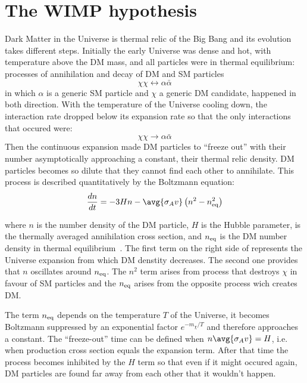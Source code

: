 \pagebreak
\section{The WIMP hypothesis}
\label{sec:wimp}
Dark Matter in the Universe is thermal relic of the Big Bang and its evolution takes different steps. Initially the early Universe was dense and hot, with temperature above the DM mass, and all particles were in thermal equilibrium: processes of annihilation and decay of DM and SM particles 
\begin{equation}
\chi\chi\longleftrightarrow \alpha\bar{\alpha}
\end{equation}
in which $\alpha$ is a generic SM particle and $\chi$ a generic DM candidate, happened in both direction. With the temperature of the Universe cooling down, the interaction rate dropped below its expansion rate so that the only interactions that occured were:
\begin{equation}
\chi\chi\rightarrow \alpha\bar{\alpha}
\label{chitosm}
\end{equation}
Then the continuous expansion made DM particles to ``freeze out'' with their number asymptotically approaching a constant, their thermal relic density. DM particles becomes so dilute that they cannot find each other to annihilate. This process is described quantitatively by the Boltzmann equation:
\begin{equation}
\frac{dn}{dt}=-3Hn-\avg{\sigma_A v}\left(n^2-n_{\textup{eq}}^2\right)
\label{eqn:boltz}
\end{equation}

where $n$ is the number density of the DM particle, $H$ is the Hubble parameter,  is the thermally averaged annihilation cross section, and $n_{\textup{eq}}$ is the DM number density in thermal equilibrium~\cite{feng:DM}. The first term on the right side of \Eqn{\ref{eqn:boltz}} represents the Universe expansion from which DM denstity decreases. The second one provides that $n$ oscillates around $n_\textup{eq}$. The $n^2$ term arises from \Eqn{\ref{chitosm}} process that destroys $\chi$ in favour of SM particles and the $n_\textup{eq}$ arises from the opposite process wich creates DM.

The term $n_\textup{eq}$ depends on the temperature $T$ of the Universe, it becomes Boltzmann suppressed by an exponential factor $e^{-m_\chi/T}$ and therefore approaches a constant. The ``freeze-out'' time can be defined when $n\avg{\sigma_A v} = H$, i.e. when production cross section equals the expansion term. After that time the \Eqn{\ref{chitosm}} process becomes inhibited by the $H$ term so that even if it might occured again, DM particles are found far away from each other that it wouldn't happen.  

